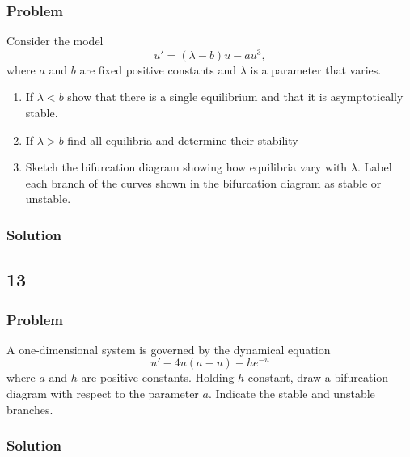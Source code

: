 \documentclass[12pt]{article}
\begin{document}
\subsubsection*{Problem}
Consider the model
\begin{equation}
  \label{eq:9-problem}
  u'=(\lambda - b) u-au^3,
\end{equation}
where $a$ and $b$ are fixed positive constants and $\lambda$ is a parameter that
varies.

\begin{enumerate}
\item If $\lambda < b$  show that there is a single equilibrium and that it is
  asymptotically stable.
\item If $\lambda > b$ find all equilibria and determine their stability
\item Sketch the bifurcation diagram showing how equilibria vary with $\lambda$.
  Label each branch of the curves shown in the bifurcation diagram as stable or
  unstable.
\end{enumerate}

\subsubsection*{Solution}
\todo[]

\subsection{13}
\subsubsection*{Problem}
A one-dimensional system is governed by the dynamical equation
\begin{equation}
  \label{eq:13-problem}
  u'-4u(a-u)-he^{-u}
\end{equation}
where $a$ and $h$ are positive constants. Holding $h$ constant, draw a
bifurcation diagram with respect to the parameter $a$. Indicate the stable and
unstable branches.

\subsubsection*{Solution}
\todo[]

\newpage
\end{document}
